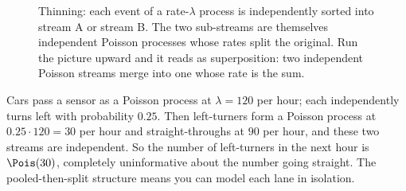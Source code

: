 \begin{figure}[H]
\centering
{}
\caption{Thinning: each event of a rate-$\lambda$ process is independently
sorted into stream A or stream B. The two sub-streams are themselves independent
Poisson processes whose rates split the original. Run the picture upward and it
reads as superposition: two independent Poisson streams merge into one whose rate
is the sum.}
\label{ch25:fig-thinning}
\end{figure}

\begin{example}
\label{ch25:ex-thinning}
Cars pass a sensor as a Poisson process at $\lambda = 120$ per hour; each
independently turns left with probability $0.25$. Then left-turners form a
Poisson process at $0.25 \cdot 120 = 30$ per hour and straight-throughs at $90$
per hour, and these two streams are independent. So the number of left-turners in
the next hour is $\Pois(30)$, completely uninformative about the number going
straight. The pooled-then-split structure means you can model each lane in
isolation.
\end{example}

